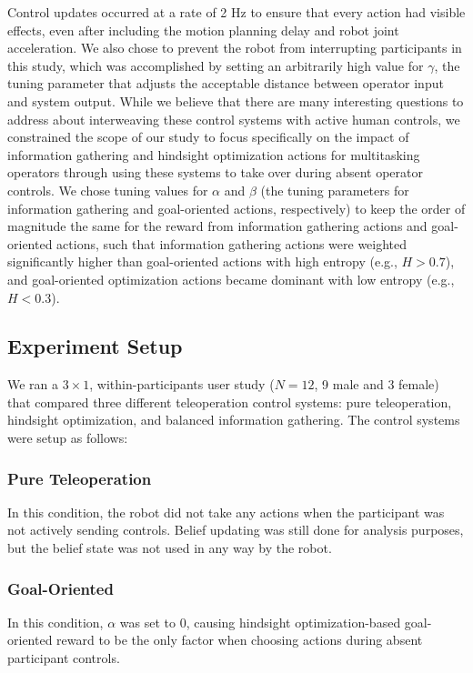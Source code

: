 \documentclass[conference]{IEEEtran}
\begin{document}
Control updates occurred at a rate of 2 Hz to ensure that every action had visible effects, even after including the motion planning delay and robot joint acceleration. We also chose to prevent the robot from interrupting participants in this study, which was accomplished by setting an arbitrarily high value for $\gamma$, the tuning parameter that adjusts the acceptable distance between operator input and system output. While we believe that there are many interesting questions to address about interweaving these control systems with active human controls, we constrained the scope of our study to focus specifically on the impact of information gathering and hindsight optimization actions for multitasking operators through using these systems to take over during absent operator controls. We chose tuning values for $\alpha$ and $\beta$ (the tuning parameters for information gathering and goal-oriented actions, respectively) to keep the order of magnitude the same for the reward from information gathering actions and goal-oriented actions, such that information gathering actions were weighted significantly higher than goal-oriented actions with high entropy (e.g., $H > 0.7$), and goal-oriented optimization actions became dominant with low entropy (e.g., $H < 0.3$).

\subsection{Experiment Setup}

We ran a $3 \times 1$, within-participants user study ($N = 12$, 9 male and 3 female) that compared three different teleoperation control systems: pure teleoperation, hindsight optimization, and balanced information gathering. The control systems were setup as follows:

\subsubsection{Pure Teleoperation}
In this condition, the robot did not take any actions when the participant was not actively sending controls. Belief updating was still done for analysis purposes, but the belief state was not used in any way by the robot.
\subsubsection{Goal-Oriented}
In this condition, $\alpha$ was set to 0, causing hindsight optimization-based goal-oriented reward to be the only factor when choosing actions during absent participant controls.
\end{document}
